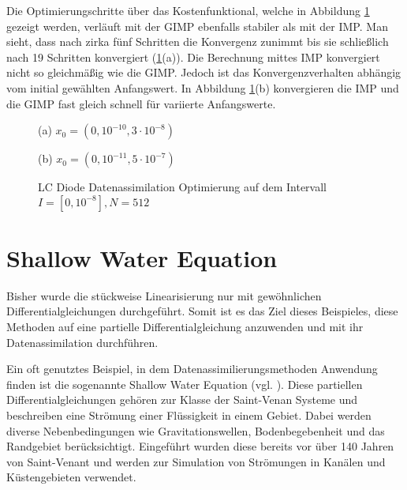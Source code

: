 Die Optimierungschritte über das Kostenfunktional, welche in Abbildung \ref{fig:lcOpt} gezeigt werden, verläuft mit der GIMP ebenfalls stabiler als mit der IMP. Man sieht, dass nach zirka fünf Schritten die Konvergenz zunimmt bis sie schließlich nach 19 Schritten konvergiert (\ref{fig:lcOpt}(a)). Die Berechnung mittes IMP konvergiert nicht so gleichmäßig wie die GIMP. Jedoch ist das Konvergenzverhalten abhängig vom initial gewählten Anfangswert. In Abbildung \ref{fig:lcOpt}(b) konvergieren die IMP und die GIMP fast gleich schnell für variierte Anfangswerte.

\begin{figure}[H]
\footnotesize
\centering
\begin{minipage}[b]{0.49\linewidth}

\caption*{(a) $x_0=(0,10^{-10},3\cdot 10^{-8})$}
\end{minipage}
\begin{minipage}[b]{0.49\linewidth}

\caption*{(b) $x_0=(0,10^{-11},5\cdot 10^{-7})$}
\end{minipage}
\caption{LC Diode Datenassimilation Optimierung auf dem Intervall $I = [0,10^{-8}], N=512$}
\label{fig:lcOpt}
\end{figure}


\section{Shallow Water Equation}
Bisher wurde die stückweise Linearisierung nur mit gewöhnlichen Differentialgleichungen durchgeführt. Somit ist es das Ziel dieses Beispieles, diese Methoden auf eine partielle Differentialgleichung anzuwenden und mit ihr Datenassimilation durchführen.

Ein oft genutztes Beispiel, in dem Datenassimilierungsmethoden Anwendung finden ist die sogenannte Shallow Water Equation (vgl. \cite{zou,navon}). 
Diese partiellen Differentialgleichungen gehören zur Klasse der Saint-Venan Systeme und beschreiben eine Strömung einer Flüssigkeit in einem Gebiet. Dabei werden diverse Nebenbedingungen wie Gravitationswellen, Bodenbegebenheit und das Randgebiet berücksichtigt. Eingeführt wurden diese bereits vor über 140 Jahren von Saint-Venant \cite{saint1871theorie} und werden zur Simulation von Strömungen in Kanälen und Küstengebieten verwendet.

